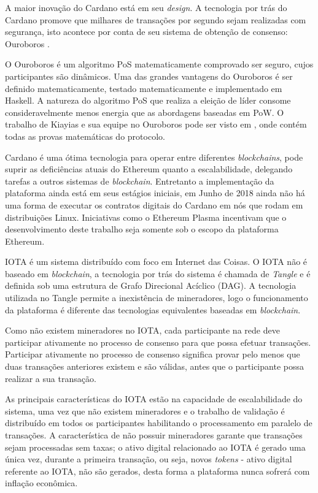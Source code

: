 \documentclass[tcc,capa]{texufpel}
\begin{document}
    A maior inovação do Cardano está em seu \textit{design}. A tecnologia por trás do Cardano promove que milhares de transações por segundo sejam realizadas com segurança, isto acontece por conta de seu sistema de obtenção de consenso: Ouroboros \cite{kiayias2017ouroboros}.
    
    O Ouroboros é um algoritmo PoS matematicamente comprovado ser seguro, cujos participantes são dinâmicos. Uma das grandes vantagens do Ouroboros é ser definido matematicamente, testado matematicamente e implementado em Haskell. A natureza do algoritmo PoS que realiza a eleição de líder consome consideravelmente menos energia que as abordagens baseadas em PoW. O trabalho de Kiayias e sua equipe no Ouroboros pode ser visto em \cite{kiayias2017ouroboros}, onde contém todas as provas matemáticas do protocolo. 
    
    Cardano é uma ótima tecnologia para operar entre diferentes \textit{blockchains}, pode suprir as deficiências atuais do Ethereum quanto a escalabilidade, delegando tarefas a outros sistemas de \textit{blockchain}. Entretanto a implementação da plataforma ainda está em seus estágios iniciais, em Junho de 2018 ainda não há uma forma de executar os contratos digitais do Cardano em nós que rodam em distribuições Linux. Iniciativas como o Ethereum Plasma incentivam que o desenvolvimento deste trabalho seja somente sob o escopo da plataforma Ethereum.
    
    IOTA é um sistema distribuído com foco em Internet das Coisas. O IOTA não é baseado em \textit{blockchain}, a tecnologia por trás do sistema é chamada de \textit{Tangle} e é definida sob uma estrutura de Grafo Direcional Acíclico (DAG). A tecnologia utilizada no Tangle permite a inexistência de mineradores, logo o funcionamento da plataforma é diferente das tecnologias equivalentes baseadas em \textit{blockchain}.
    
    Como não existem mineradores no IOTA, cada participante na rede deve participar ativamente no processo de consenso para que possa efetuar transações. Participar ativamente no processo de consenso significa provar pelo menos que duas transações anteriores existem e são válidas, antes que o participante possa realizar a sua transação.
    
    As principais características do IOTA estão na capacidade de escalabilidade do sistema, uma vez que não existem mineradores e o trabalho de validação é distribuído em todos os participantes habilitando o processamento em paralelo de transações. A característica de não possuir mineradores garante que transações sejam processadas sem taxas; o ativo digital relacionado ao IOTA é gerado uma única vez, durante a primeira transação, ou seja, novos \textit{tokens} - ativo digital referente ao IOTA, não são gerados, desta forma a plataforma nunca sofrerá com inflação econômica.
    
\end{document}
